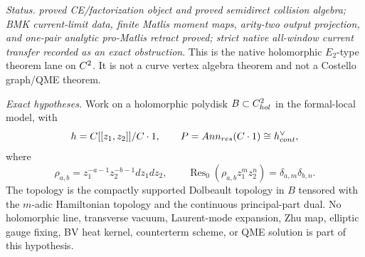 \begin{stmt}\label{thm:lane-native-holomorphic-e2-bm}
  \emph{Status.} \emph{proved CE/factorization object and proved
  semidirect collision algebra; BMK current-limit data, finite Matlis
  moment maps, arity-two output projection, and one-pair analytic
  pro-Matlis retract proved; strict native all-window current transfer
  recorded as an exact obstruction}.  This is the native
  holomorphic \(E_2\)-type theorem lane on \(C^2\).  It is not a curve
  vertex algebra theorem and not a Costello graph/QME theorem.

  \emph{Exact hypotheses.} Work on a holomorphic polydisk
  \(B\subset C^2_{hol}\) in the formal-local model, with
  \[
    h=C[[z_1,z_2]]/C\cdot1,\qquad
    P=Ann_{res}(C\cdot1)
    \cong h^\vee_{cont},
  \]
  where
  \[
    \rho_{a,b}=z_1^{-a-1}z_2^{-b-1}dz_1dz_2,\qquad
    \operatorname{Res}_0(\rho_{a,b}z_1^mz_2^n)
      =\delta_{a,m}\delta_{b,n}.
  \]
  The topology is the compactly supported Dolbeault topology in \(B\)
  tensored with the \(m\)-adic Hamiltonian topology and the continuous
  principal-part dual.  No holomorphic line, transverse vacuum,
  Laurent-mode expansion, Zhu map, elliptic gauge fixing, BV heat kernel,
  counterterm scheme, or QME solution is part of this hypothesis.


\end{stmt}
